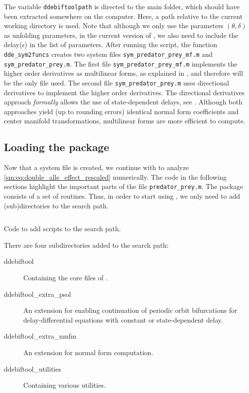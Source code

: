 \newcommand\pathToDDEBifToolDemos{./ddebiftooldemofiles/VII}
\inputminted[firstline=18, lastline=50]{MATLAB}{\pathToDDEBifToolDemos/predator_prey/gen_sym_predator_prey.m}
The variable \texttt{ddebiftoolpath} is directed to the \DDEBIFTOOL main
folder, which should have been extracted somewhere on the computer. Here, a path
relative to the current working directory is used. Note that although we only
use the parameters $(\theta,\delta)$ as unfolding parameters, in the current
version of \DDEBIFTOOL, we also need to include the delay(s) in the list of
parameters. After running the script, the function \texttt{dde_sym2funcs}
creates two system files \texttt{sym_predator_prey_mf.m} and \texttt{sym_predator_prey.m}.
The first file \texttt{sym_predator_prey_mf.m} implements the higher order derivatives
as multilinear forms, as explained in \cite[Section 6]{Switching2019}, and therefore will be the only file used.
The second file \texttt{sym_predator_prey.m}
uses directional derivatives to implement the higher order derivatives. The
directional derivatives approach \emph{formally} allows the use of
state-dependent delays, see \cite{Sieber@2017}. Although both approaches yield
(up to rounding errors) identical normal form coefficients and center manifold
transformations, multilinear forms are more efficient to compute.

\subsection{Loading the \DDEBIFTOOL package}
\label{sm:sec:loading_DDE-BIFTool}
Now that a system file is created, we continue with \DDEBIFTOOL to analyze
\cref{sm:eq:double_alle_effect_rescaled} numerically. The code in the following
sections highlight the important parts of the file \texttt{predator_prey.m}.
The package \DDEBIFTOOL consists of a set of \MATLAB routines. Thus, in order to start
using \DDEBIFTOOL, we only need to add \DDEBIFTOOL (sub)directories to the search
path.
\begin{listing}[!ht]
\inputminted[firstline=17, lastline=25]{MATLAB}{\pathToDDEBifToolDemos/predator_prey/predator_prey.m}
\caption{Code to add \DDEBIFTOOL scripts to the search path.}
\label{sm:lst:searchpath}
\end{listing}
There are four subdirectories added to the search path:
\par
\medskip
\begin{description}
\item[ddebiftool] Containing the core files of \DDEBIFTOOL.
\item[ddebiftool\_extra\_psol] An extension for enabling continuation of periodic orbit bifurcations for delay-differential equations with constant or state-dependent delay.
\item[ddebiftool\_extra\_nmfm] An extension for normal form computation.
\item[ddebiftool\_utilities] Containing various utilities.
\end{description}

